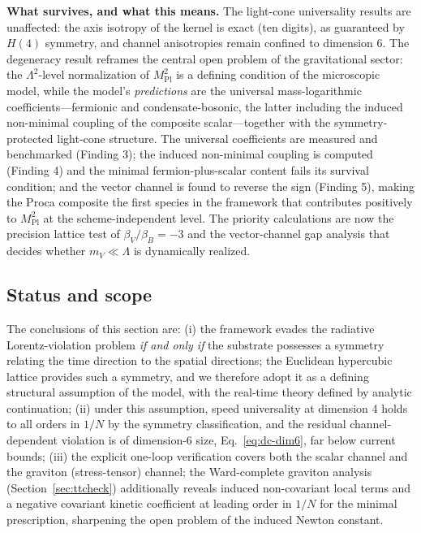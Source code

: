 \documentclass[11pt,a4paper]{article}
\begin{document}
\textbf{What survives, and what this means.}
The light-cone universality results are unaffected: the axis
isotropy of the kernel is exact (ten digits), as guaranteed by
$H(4)$ symmetry, and channel anisotropies remain confined to
dimension 6.
The degeneracy result reframes the central open problem of the
gravitational sector: the $\Lambda^2$-level normalization of
$M_{\mathrm{Pl}}^2$ is a defining condition of the microscopic
model, while the model's \emph{predictions} are the universal
mass-logarithmic coefficients---fermionic and condensate-bosonic,
the latter including the induced non-minimal coupling of the
composite scalar---together with the symmetry-protected light-cone
structure.
The universal coefficients are measured and benchmarked
(Finding 3); the induced non-minimal coupling is computed
(Finding 4) and the minimal fermion-plus-scalar content fails its
survival condition; and the vector channel is found to reverse the
sign (Finding 5), making the Proca composite the first species in
the framework that contributes positively to $M_{\mathrm{Pl}}^2$
at the scheme-independent level.
The priority calculations are now the precision lattice test of
$\beta_V/\beta_B = -3$ and the vector-channel gap analysis that
decides whether $m_V \ll \Lambda$ is dynamically realized.

\subsection{Status and scope}

The conclusions of this section are:
(i) the framework evades the radiative Lorentz-violation problem
\emph{if and only if} the substrate possesses a symmetry relating
the time direction to the spatial directions; the Euclidean
hypercubic lattice provides such a symmetry, and we therefore adopt
it as a defining structural assumption of the model, with the
real-time theory defined by analytic continuation;
(ii) under this assumption, speed universality at dimension 4 holds
to all orders in $1/N$ by the symmetry classification, and the
residual channel-dependent violation is of dimension-6 size,
Eq.~\eqref{eq:dc-dim6}, far below current bounds;
(iii) the explicit one-loop verification covers both the scalar
channel and the graviton (stress-tensor) channel; the
Ward-complete graviton analysis (Section~\ref{sec:ttcheck})
additionally reveals induced non-covariant local terms and a
negative covariant kinetic coefficient at leading order in $1/N$
for the minimal prescription, sharpening the open problem of the
induced Newton constant.
\end{document}
